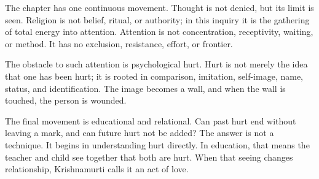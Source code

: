 The chapter has one continuous movement. Thought is not denied, but its limit is seen. Religion is not belief, ritual, or authority; in this inquiry it is the gathering of total energy into attention. Attention is not concentration, receptivity, waiting, or method. It has no exclusion, resistance, effort, or frontier.

The obstacle to such attention is psychological hurt. Hurt is not merely the idea that one has been hurt; it is rooted in comparison, imitation, self-image, name, status, and identification. The image becomes a wall, and when the wall is touched, the person is wounded.

The final movement is educational and relational. Can past hurt end without leaving a mark, and can future hurt not be added? The answer is not a technique. It begins in understanding hurt directly. In education, that means the teacher and child see together that both are hurt. When that seeing changes relationship, Krishnamurti calls it an act of love.